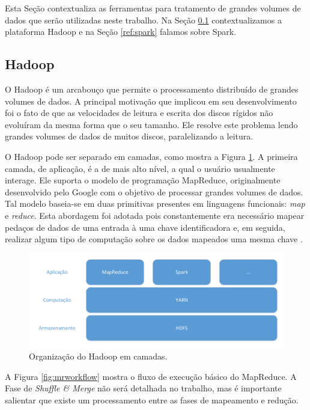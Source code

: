 Esta Seção contextualiza as ferramentas para tratamento de grandes volumes de 
dados que serão utilizadas neste trabalho. Na Seção \ref{ref:hadoop} 
contextualizamos a plataforma Hadoop e na Seção \ref{ref:spark} falamos sobre 
Spark.

\subsection{Hadoop} \label{ref:hadoop}

O Hadoop é um arcabouço que permite o processamento distribuído de 
grandes volumes de dados. A principal motivação que implicou em seu 
desenvolvimento foi o fato de que as velocidades de leitura e escrita dos 
discos rígidos não evoluíram da mesma forma que o seu tamanho. Ele resolve este 
problema lendo grandes volumes de dados de muitos discos, paralelizando a 
leitura.

O Hadoop pode ser separado em camadas, como mostra a Figura \ref{fig:hadoop}. A 
primeira camada, de aplicação,  é a de mais alto nível, a qual o usuário 
usualmente interage. Ele suporta o modelo de programação MapReduce, 
originalmente desenvolvido pelo Google com o objetivo de processar grandes 
volumes de dados. Tal modelo baseia-se em duas primitivas presentes em 
linguagens funcionais: \textit{map} e \textit{reduce}. Esta abordagem  foi 
adotada 
pois constantemente era necessário mapear pedaços de dados de uma entrada à 
uma chave identificadora e, em seguida, realizar algum tipo de 
computação sobre os dados mapeados uma mesma chave \cite{ref:mapreduce}.

\begin{figure}[H]
 \centerline{\includegraphics[width=1\textwidth]{./img/hadoop-layers.pdf}}
 \caption{Organização do Hadoop em camadas.}
 \label{fig:hadoop}
\end{figure}

A Figura \ref{fig:mrworkflow} mostra o fluxo de execução básico do MapReduce. 
A Fase de \textit{Shuffle \& Merge} não será detalhada no trabalho, mas é 
importante salientar que existe um processamento entre as fases de mapeamento e 
redução.

